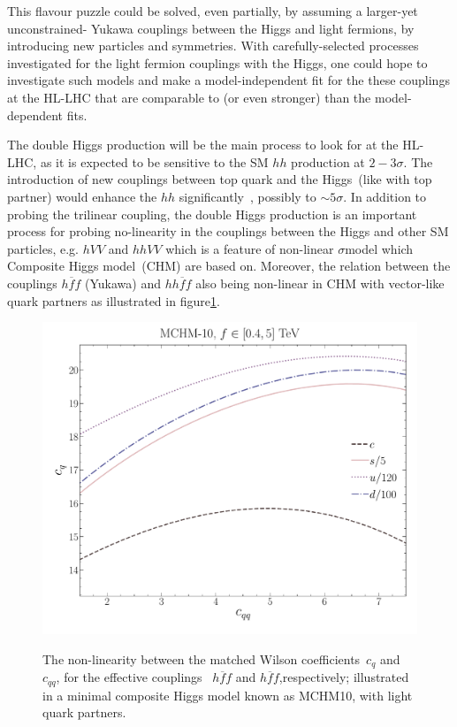 \documentclass[12pt]{article}
\renewcommand{\bar}{\overline}
\begin{document}
 This flavour puzzle could be solved, even partially, by assuming a larger-yet unconstrained- Yukawa couplings between the Higgs and light fermions, by introducing new particles and symmetries. With carefully-selected processes investigated for the light fermion couplings with the Higgs, one could hope to investigate such models and make a model-independent fit for the these couplings at the HL-LHC that are comparable to (or even stronger) than the model-dependent fits. 
 \par The double Higgs production will be the main process to look for at the HL-LHC, as it is expected to be sensitive to the SM $hh$ production at $2-3 \sigma$. The introduction of new couplings between top quark and the Higgs~(like with top partner) would enhance the $hh$ significantly~\cite{Dib:2005re, Grober:2010yv, Contino:2012xk, Grober:2016wmf}, possibly to $\sim 5 \sigma$. In addition to probing the trilinear coupling, the double Higgs production is an important process for probing no-linearity in the couplings between the Higgs and other SM particles, e.g. $hVV$ and $hhVV$ which is a feature of non-linear $\sigma$model which Composite Higgs model~(CHM) are based on. Moreover, the relation between the couplings $h \bar f f$ (Yukawa) and  $h h \bar f f$ also being non-linear in CHM with vector-like quark partners as illustrated in figure\ref{chm10}.
 \begin{figure}[!htbp]
 	\centering
 	\includegraphics[scale=0.25]{chm_cqcqq}
 	\label{chm10}
 	\caption{The non-linearity between the matched Wilson coefficients~$ c_q$ and $ c_{qq}$, for the effective couplings ~$h \bar f f$ and $h \bar f f$,respectively; illustrated in a minimal composite Higgs model known as MCHM10, with light quark partners. }
 \end{figure}
\end{document}
